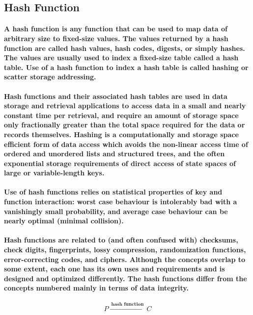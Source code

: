 \documentclass[10pt,british]{article}
\begin{document}
\subsection{Hash Function}

\paragraph{\textmd{A hash function is any function that can be used to map data
of arbitrary size to fixed-size values. The values returned by a hash
function are called hash values, hash codes, digests, or simply hashes.
The values are usually used to index a fixed-size table called a hash
table. Use of a hash function to index a hash table is called hashing
or scatter storage addressing.}}

\paragraph{\textmd{Hash functions and their associated hash tables are used
in data storage and retrieval applications to access data in a small
and nearly constant time per retrieval, and require an amount of storage
space only fractionally greater than the total space required for
the data or records themselves. Hashing is a computationally and storage
space efficient form of data access which avoids the non-linear access
time of ordered and unordered lists and structured trees, and the
often exponential storage requirements of direct access of state spaces
of large or variable-length keys.}}

\paragraph{\textmd{Use of hash functions relies on statistical properties of
key and function interaction: worst case behaviour is intolerably
bad with a vanishingly small probability, and average case behaviour
can be nearly optimal (minimal collision).}}

\paragraph{\textmd{Hash functions are related to (and often confused with) checksums,
check digits, fingerprints, lossy compression, randomization functions,
error-correcting codes, and ciphers. Although the concepts overlap
to some extent, each one has its own uses and requirements and is
designed and optimized differently. The hash functions differ from
the concepts numbered mainly in terms of data integrity.}}
\begin{center}
$$ P\xrightarrow{\:\textbf{hash function}\:}C $$
\par\end{center}
\end{document}
